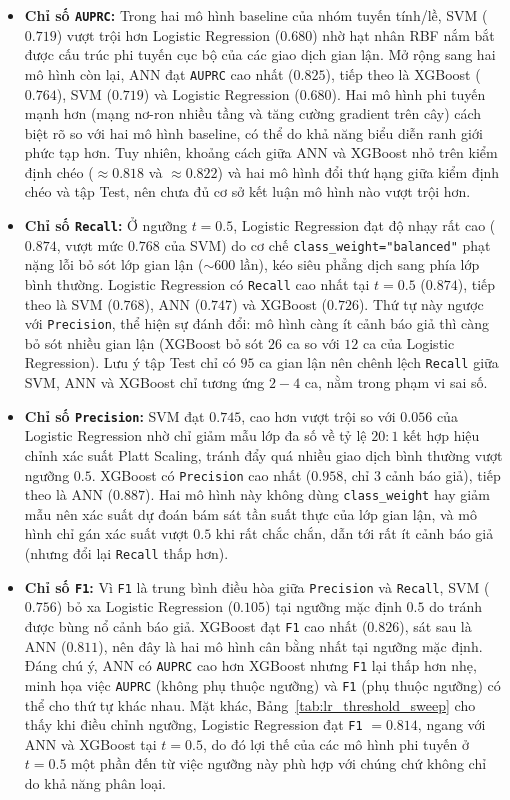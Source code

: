 \begin{itemize}
    \item \textbf{Chỉ số \texttt{AUPRC}:} Trong hai mô hình baseline của nhóm tuyến tính/lề, SVM ($0.719$) vượt trội hơn Logistic Regression ($0.680$) nhờ hạt nhân RBF nắm bắt được cấu trúc phi tuyến cục bộ của các giao dịch gian lận. Mở rộng sang hai mô hình còn lại, ANN đạt \texttt{AUPRC} cao nhất ($0.825$), tiếp theo là XGBoost ($0.764$), SVM ($0.719$) và Logistic Regression ($0.680$). Hai mô hình phi tuyến mạnh hơn (mạng nơ-ron nhiều tầng và tăng cường gradient trên cây) cách biệt rõ so với hai mô hình baseline, có thể do khả năng biểu diễn ranh giới phức tạp hơn. Tuy nhiên, khoảng cách giữa ANN và XGBoost nhỏ trên kiểm định chéo ($\approx 0.818$ và $\approx 0.822$) và hai mô hình đổi thứ hạng giữa kiểm định chéo và tập Test, nên chưa đủ cơ sở kết luận mô hình nào vượt trội hơn.
    \item \textbf{Chỉ số \texttt{Recall}:} Ở ngưỡng $t = 0.5$, Logistic Regression đạt độ nhạy rất cao ($0.874$, vượt mức $0.768$ của SVM) do cơ chế \texttt{class\_weight="balanced"} phạt nặng lỗi bỏ sót lớp gian lận ($\sim 600$ lần), kéo siêu phẳng dịch sang phía lớp bình thường. Logistic Regression có \texttt{Recall} cao nhất tại $t = 0.5$ ($0.874$), tiếp theo là SVM ($0.768$), ANN ($0.747$) và XGBoost ($0.726$). Thứ tự này ngược với \texttt{Precision}, thể hiện sự đánh đổi: mô hình càng ít cảnh báo giả thì càng bỏ sót nhiều gian lận (XGBoost bỏ sót $26$ ca so với $12$ ca của Logistic Regression). Lưu ý tập Test chỉ có $95$ ca gian lận nên chênh lệch \texttt{Recall} giữa SVM, ANN và XGBoost chỉ tương ứng $2 - 4$ ca, nằm trong phạm vi sai số.
    \item \textbf{Chỉ số \texttt{Precision}:} SVM đạt $0.745$, cao hơn vượt trội so với $0.056$ của Logistic Regression nhờ chỉ giảm mẫu lớp đa số về tỷ lệ $20:1$ kết hợp hiệu chỉnh xác suất Platt Scaling, tránh đẩy quá nhiều giao dịch bình thường vượt ngưỡng $0.5$. XGBoost có \texttt{Precision} cao nhất ($0.958$, chỉ $3$ cảnh báo giả), tiếp theo là ANN ($0.887$). Hai mô hình này không dùng \texttt{class\_weight} hay giảm mẫu nên xác suất dự đoán bám sát tần suất thực của lớp gian lận, và mô hình chỉ gán xác suất vượt $0.5$ khi rất chắc chắn, dẫn tới rất ít cảnh báo giả (nhưng đổi lại \texttt{Recall} thấp hơn).
    \item \textbf{Chỉ số \texttt{F1}:} Vì \texttt{F1} là trung bình điều hòa giữa \texttt{Precision} và \texttt{Recall}, SVM ($0.756$) bỏ xa Logistic Regression ($0.105$) tại ngưỡng mặc định $0.5$ do tránh được bùng nổ cảnh báo giả. XGBoost đạt \texttt{F1} cao nhất ($0.826$), sát sau là ANN ($0.811$), nên đây là hai mô hình cân bằng nhất tại ngưỡng mặc định. Đáng chú ý, ANN có \texttt{AUPRC} cao hơn XGBoost nhưng \texttt{F1} lại thấp hơn nhẹ, minh họa việc \texttt{AUPRC} (không phụ thuộc ngưỡng) và \texttt{F1} (phụ thuộc ngưỡng) có thể cho thứ tự khác nhau. Mặt khác, Bảng~\ref{tab:lr_threshold_sweep} cho thấy khi điều chỉnh ngưỡng, Logistic Regression đạt \texttt{F1} $= 0.814$, ngang với ANN và XGBoost tại $t = 0.5$, do đó lợi thế của các mô hình phi tuyến ở $t = 0.5$ một phần đến từ việc ngưỡng này phù hợp với chúng chứ không chỉ do khả năng phân loại.
\end{itemize}

